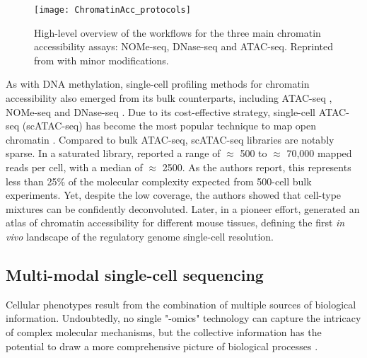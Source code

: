 \begin{figure}[H]
	\centering
	\texttt{[image: ChromatinAcc\_protocols]}
	\caption[]{High-level overview of the workflows for the three main chromatin accessibility assays: NOMe-seq, DNase-seq and ATAC-seq. Reprinted from \cite{Nordstrom2019} with minor modifications.}
	\label{fig:ChromatinAcc_protocols}
\end{figure}

As with DNA methylation, single-cell profiling methods for chromatin accessibility also emerged from its bulk counterparts, including ATAC-seq \cite{Buenrostro2015a}, NOMe-seq \cite{Pott2016} and DNase-seq \cite{Jin2015}. Due to its cost-effective strategy, single-cell ATAC-seq (scATAC-seq) has become the most popular technique to map open chromatin \cite{Cusanovich2015,Cao2018,Chen2018}. Compared to bulk ATAC-seq, scATAC-seq libraries are notably sparse. In a saturated library, \cite{Cusanovich2015} reported a range of $\approx$ 500 to $\approx$ 70,000 mapped reads per cell, with a median of $\approx$ 2500. As the authors report, this represents less than 25\% of the molecular complexity expected from 500-cell bulk experiments. Yet, despite the low coverage, the authors showed that cell-type mixtures can be confidently deconvoluted. Later, in a pioneer effort, \cite{Cusanovich2018b} generated an atlas of chromatin accessibility for different mouse tissues, defining the first \textit{in vivo} landscape of the regulatory genome single-cell resolution.



\subsection{Multi-modal single-cell sequencing} \label{section:single_cell_multi_modal}

Cellular phenotypes result from the combination of multiple sources of biological information. Undoubtedly, no single "-omics" technology can capture the intricacy of complex molecular mechanisms, but the collective information has the potential to draw a more comprehensive picture of biological processes \cite{Hasin2017,Ritchie2015}.

